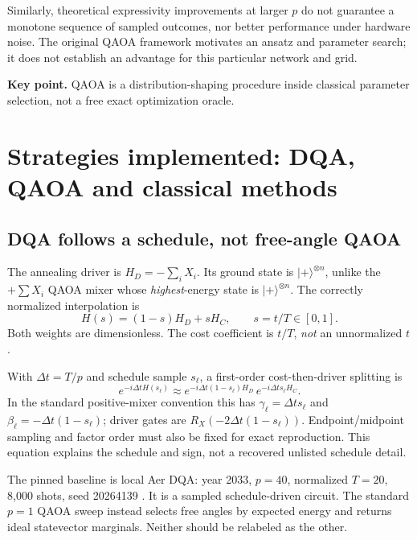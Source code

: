 \documentclass[11pt,letterpaper]{article}
\newcommand{\ket}[1]{\lvert #1\rangle}
\newcommand{\takeaway}[1]{\par\smallskip\textbf{Key point.} #1\par}
\begin{document}
Similarly, theoretical expressivity improvements at larger $p$ do not guarantee a monotone sequence of sampled outcomes, nor better performance under hardware noise. The original QAOA framework motivates an ansatz and parameter search; it does not establish an advantage for this particular network and grid.
\takeaway{QAOA is a distribution-shaping procedure inside classical parameter selection, not a free exact optimization oracle.}
\section{Strategies implemented: DQA, QAOA and classical methods}\label{sec:methods}
\subsection{DQA follows a schedule, not free-angle QAOA}
The annealing driver is $H_D=-\sum_iX_i$. Its ground state is $\ket+^{\otimes n}$, unlike the $+\sum X_i$ QAOA mixer whose \emph{highest}-energy state is $\ket+^{\otimes n}$. The correctly normalized interpolation is
\begin{equation}
 H(s)=(1-s)H_D+sH_C,\qquad s=t/T\in[0,1].\label{eq:schedule}
\end{equation}
Both weights are dimensionless. The cost coefficient is $t/T$, \emph{not} an unnormalized $t$.

With $\Delta t=T/p$ and schedule sample $s_\ell$, a first-order cost-then-driver splitting is
\begin{equation}
 e^{-i\Delta tH(s_\ell)}\approx
 e^{-i\Delta t(1-s_\ell)H_D}\,e^{-i\Delta t s_\ell H_C}.
\end{equation}
In the standard positive-mixer convention this has $\gamma_\ell=\Delta t s_\ell$ and $\beta_\ell=-\Delta t(1-s_\ell)$; driver gates are $R_X(-2\Delta t(1-s_\ell))$. Endpoint/midpoint sampling and factor order must also be fixed for exact reproduction. This equation explains the schedule and sign, not a recovered unlisted schedule detail.

The pinned baseline is local Aer DQA: year 2033, $p=40$, normalized $T=20$, 8,000 shots, seed 20264139 \cite{views,dashboard}. It is a sampled schedule-driven circuit. The standard $p=1$ QAOA sweep instead selects free angles by expected energy and returns ideal statevector marginals. Neither should be relabeled as the other.
\end{document}
